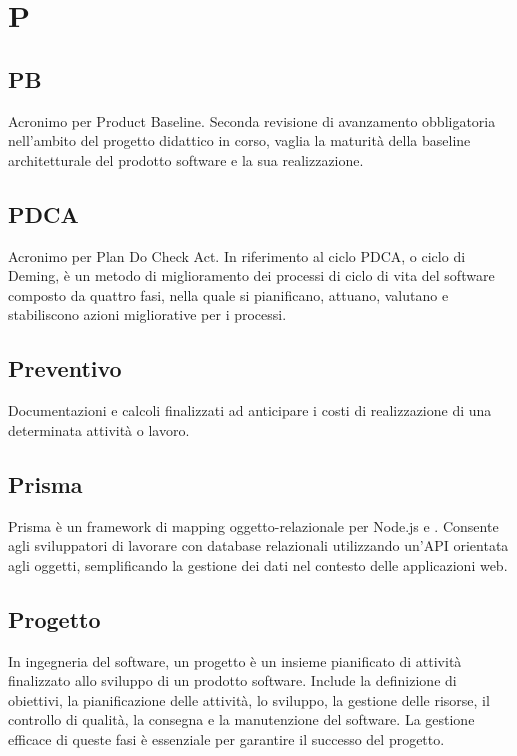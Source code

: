 \chapter{P}

\section{PB}\label{sec:Product \ccgloss{Baseline}}
Acronimo per Product Baseline. Seconda revisione di avanzamento obbligatoria nell'ambito del progetto didattico in corso, vaglia la maturità della baseline architetturale del prodotto software e la sua realizzazione.

\section{PDCA}\label{sec:Plan Do Check Act}
Acronimo per Plan Do Check Act. In riferimento al ciclo PDCA, o ciclo di Deming, è un metodo di miglioramento dei processi di ciclo di vita del software composto da quattro fasi, nella quale si pianificano, attuano, valutano e stabiliscono azioni migliorative per i processi.

\section{Preventivo}\label{sec:Preventivi}
Documentazioni e calcoli finalizzati ad anticipare i costi di realizzazione di una determinata attività o lavoro.

\section{Prisma}
Prisma  è un framework di mapping oggetto-relazionale per Node.js e . Consente agli sviluppatori di lavorare con database relazionali utilizzando un'API orientata agli oggetti, semplificando la gestione dei dati nel contesto delle applicazioni web.

\section{Progetto}\label{sec:Progetti}
In ingegneria del software, un progetto è un insieme pianificato di attività finalizzato allo sviluppo di un prodotto software. Include la definizione di obiettivi, la pianificazione delle attività, lo sviluppo, la gestione delle risorse, il controllo di qualità, la consegna e la manutenzione del software. La gestione efficace di queste fasi è essenziale per garantire il successo del progetto.

